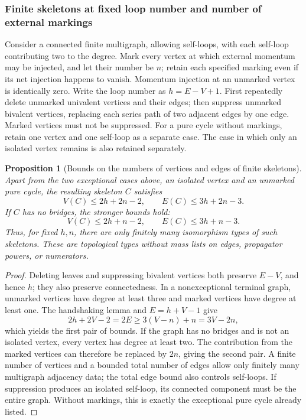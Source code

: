 \documentclass[11pt,a4paper,oneside]{article}
\theoremstyle{plain}
\newtheorem{proposition}[theorem]{Proposition}
\theoremstyle{definition}
\theoremstyle{remark}
\numberwithin{equation}{section}
\begin{document}
\subsubsection{Finite skeletons at fixed loop number and number of external markings}
Consider a connected finite multigraph, allowing self-loops, with each self-loop contributing two to the degree. Mark every vertex
at which external momentum may be injected, and let their number be $n$; retain each specified marking even if its net injection happens to vanish.
Momentum injection at an unmarked vertex is identically zero. Write the loop number as $h=E-V+1$.
First repeatedly delete unmarked univalent vertices and their edges; then suppress unmarked bivalent vertices,
replacing each series path of two adjacent edges by one edge. Marked vertices must not be suppressed.
For a pure cycle without markings, retain one vertex and one self-loop as a separate case.
The case in which only an isolated vertex remains is also retained separately.

\begin{proposition}[Bounds on the numbers of vertices and edges of finite skeletons]\label{unified:prop:finitecore}
Apart from the two exceptional cases above, an isolated vertex and an unmarked pure cycle, the resulting skeleton $C$ satisfies
\[
 V(C)\le 2h+2n-2,\qquad E(C)\le 3h+2n-3.
\]
If $C$ has no bridges, the stronger bounds hold:
\[
 V(C)\le 2h+n-2,\qquad E(C)\le 3h+n-3.
\]
Thus, for fixed $h,n$, there are only finitely many isomorphism types of such skeletons.
These are topological types without mass lists on edges, propagator powers, or numerators.
\end{proposition}
\begin{proof}
Deleting leaves and suppressing bivalent vertices both preserve $E-V$, and hence $h$; they also preserve connectedness.
In a nonexceptional terminal graph, unmarked vertices have degree at least three and marked vertices have degree at least one.
The handshaking lemma and $E=h+V-1$ give
\[
 2h+2V-2=2E\ge3(V-n)+n=3V-2n,
\]
which yields the first pair of bounds. If the graph has no bridges and is not an isolated vertex, every vertex has degree at least two.
The contribution from the marked vertices can therefore be replaced by $2n$, giving the second pair.
A finite number of vertices and a bounded total number of edges allow only finitely many multigraph adjacency data; the total edge bound also controls self-loops.
If suppression produces an isolated self-loop, its connected component must be the entire graph.
Without markings, this is exactly the exceptional pure cycle already listed.
\end{proof}
\end{document}
